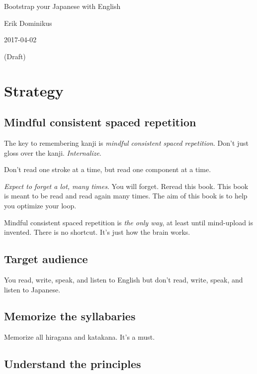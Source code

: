 \documentclass[12pt,openany]{book}
\begin{document}
\frontmatter
{}
{}
\begin{titlepage}
{%
    \setlength\parindent{0em}%
    {\Large Bootstrap your Japanese with English}\par\vspace{2em}
    Erik Dominikus\par
    2017-04-02\par
    (Draft)\par
}
\end{titlepage}
{}
\tableofcontents
\mainmatter
\chapter{Strategy}

\section{Mindful consistent spaced repetition}

The key to remembering kanji is
\emph{mindful consistent spaced repetition}.
Don't just gloss over the kanji.
\emph{Internalize}.

Don't read one stroke at a time,
but read one component at a time.

\emph{Expect to forget a lot, many times}.
You will forget.
Reread this book.
This book is meant to be read and read again many times.
The aim of this book is to help you optimize your loop.

Mindful consistent spaced repetition is \emph{the only way},
at least until mind-upload is invented.
There is no shortcut.
It's just how the brain works.

\section{Target audience}

You read, write, speak, and listen to English but don't read, write, speak, and listen to Japanese.

\section{Memorize the syllabaries}

Memorize all hiragana and katakana.
It's a must.

\section{Understand the principles}
\end{document}
